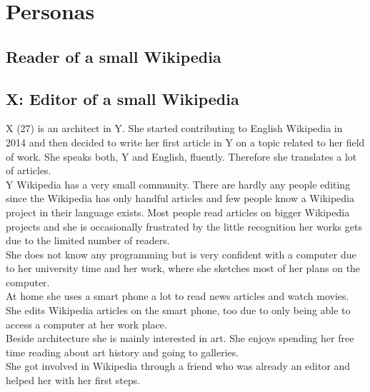 \section{Personas}

\subsection{Reader of a small Wikipedia}

\subsection{X: Editor of a small Wikipedia}
X (27) is an architect in Y. She started contributing to English Wikipedia in 2014 and then decided to write her first article in Y on a topic related to her field of work. She speaks both, Y and English, fluently. Therefore she translates a lot of articles. \\
Y Wikipedia has a very small community. There are hardly any people editing since the Wikipedia has only handful articles and few people know a Wikipedia project in their language exists. Most people read articles on bigger Wikipedia projects and she is occasionally frustrated by the little recognition her works gets due to the limited number of readers. \\
She does not know any programming but is very confident with a computer due to her university time and her work, where she sketches most of her plans on the computer. \\
At home she uses a smart phone a lot to read news articles and watch movies. She edits Wikipedia articles on the smart phone, too due to only being able to access a computer at her work place. \\  
Beside architecture she is mainly interested in art. She enjoys spending her free time reading about art history and going to galleries. \\
She got involved in Wikipedia through a friend who was already an editor and helped her with her first steps.

